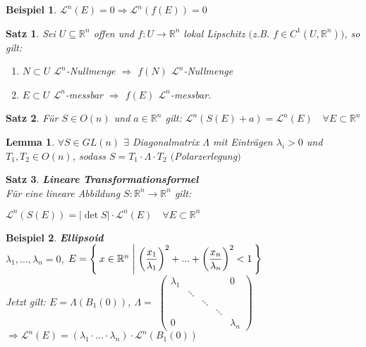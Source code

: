 \documentclass[11pt]{memoir}
\theoremstyle{changebreak}
\newtheorem{Beispiel}{Beispiel}[chapter]
\newtheorem{Lemma}{Lemma}[chapter]
\newtheorem{Satz}{Satz}[chapter]
\begin{document}
\begin{Beispiel}
$\mathscr L^n(E) = 0 \Rightarrow \mathscr L^n(f(E)) = 0$
\end{Beispiel}



\begin{Satz}
Sei $U \subseteq \mathbb R^n$ offen und $f: U \rightarrow \mathbb R^n$ lokal Lipschitz $($z.B. $f \in C^1(U, \mathbb R^n))$, so gilt:
\begin{enumerate}
	\item $N \subset U$ $\mathscr L^n$-Nullmenge $\Rightarrow$ $f(N)$ $\mathscr L^n$-Nullmenge
	\item $E \subset U$ $\mathscr L^n$-messbar $\Rightarrow$ $f(E)$ $\mathscr L^n$-messbar.
\end{enumerate}
\end{Satz}


\begin{Satz}
Für $S \in O(n)$ und $a \in \mathbb R^n$ gilt:
$\mathscr L^n (S(E) +a) = \mathscr L^n(E)\quad \forall E \subset \mathbb R^n$
\end{Satz}


\begin{Lemma}
$\forall S \in GL(n)$ $\exists$ Diagonalmatrix $\Lambda$ mit Einträgen $\lambda_i > 0$ und $T_1, T_2 \in O(n)$, sodass $S = T_1\cdotp\Lambda\cdotp T_2$ $($Polarzerlegung$)$
\end{Lemma}


\begin{Satz}
\emph{\textbf{Lineare Transformationsformel}} \\
Für eine lineare Abbildung $S: \mathbb R^n \rightarrow \mathbb R^n$ gilt: 
\begin{center}
	$\mathscr L^n(S(E)) = \vert\det S \vert \cdotp \mathscr L^n(E) \quad \forall E \subset \mathbb R^n$
\end{center}
\end{Satz}


\begin{Beispiel}
\emph{\textbf{Ellipsoid}} \\
$\lambda_1, ..., \lambda_n = 0$, $E = \Set{ x \in \mathbb R^n | \left( \dfrac{x_1}{\lambda_1} \right)^2 + ... + \left (\dfrac{x_n}{\lambda_n}\right)^2 < 1 }$ \\
Jetzt gilt: $E = \Lambda(B_1(0))$,\; $\Lambda =$
$\begin{pmatrix}
      \lambda_1 & 	 &	&	& 0 \\
      		 &  	\ddots \\
		 &	& \ddots \\
		 &	&	& \ddots \\
		 0 &	&	&	&	\lambda_n
\end{pmatrix}$ \\
$\Rightarrow \mathscr L^n(E) = (\lambda_1 \cdotp ... \cdotp \lambda_n) \cdotp \mathscr L^n(B_1(0))$
\end{Beispiel}
\end{document}

